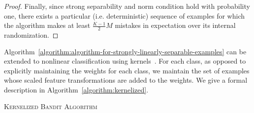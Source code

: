 \begin{proof}

Finally, since strong separability and norm condition hold with probability one,
there exists a particular (i.e. deterministic) sequence of examples for which
the algorithm makes at least $\frac{K-1}{2} M$ mistakes in expectation
over its internal randomization.
\end{proof}

Algorithm~\ref{algorithm:algorithm-for-strongly-linearly-separable-examples}
can be extended to nonlinear classification using kernels~\cite{Scholkopf-Smola-Bach-2002}.
For each class, as opposed
to explicitly maintaining the weights for each class, we maintain
the set of examples whose scaled feature transformations are added to the weights.
We give a formal description in Algorithm~\ref{algorithm:kernelized}.

\begin{algorithm}[h]
\caption{\textsc{Kernelized Bandit Algorithm}
\label{algorithm:kernelized}}
\begin{algorithmic}[1]
{
\ELSE
{}
\ENDIF
\ELSE
{}
\ELSE
{}
\ENDIF
\ENDIF
\ENDFOR
}
\end{algorithmic}
\end{algorithm}
